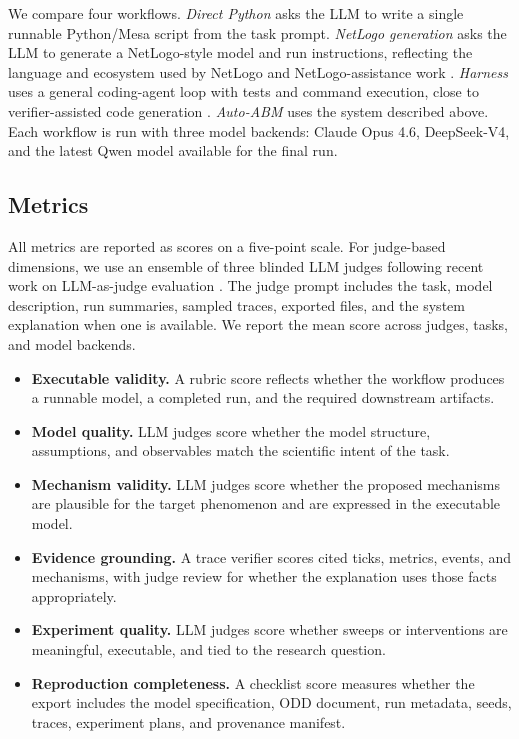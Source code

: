 \documentclass[11pt]{article}
\newcommand{\sys}{Auto-ABM}
\begin{document}
We compare four workflows. \textit{Direct Python} asks the LLM to write a single runnable Python/Mesa script from the task prompt. \textit{NetLogo generation} asks the LLM to generate a NetLogo-style model and run instructions, reflecting the language and ecosystem used by NetLogo and NetLogo-assistance work \citep{wilensky1999netlogo,chen2024netlogochat,martinez2024netlogo}. \textit{Harness} uses a general coding-agent loop with tests and command execution, close to verifier-assisted code generation \citep{niu2024sage}. \textit{\sys{}} uses the system described above. Each workflow is run with three model backends: Claude Opus 4.6, DeepSeek-V4, and the latest Qwen model available for the final run.

\subsection{Metrics}
\label{subsec:metrics}

All metrics are reported as scores on a five-point scale. For judge-based dimensions, we use an ensemble of three blinded LLM judges following recent work on LLM-as-judge evaluation \citep{liu2023geval,zheng2023judging}. The judge prompt includes the task, model description, run summaries, sampled traces, exported files, and the system explanation when one is available. We report the mean score across judges, tasks, and model backends.

\begin{itemize}[leftmargin=*]
  \item \textbf{Executable validity.} A rubric score reflects whether the workflow produces a runnable model, a completed run, and the required downstream artifacts.
  \item \textbf{Model quality.} LLM judges score whether the model structure, assumptions, and observables match the scientific intent of the task.
  \item \textbf{Mechanism validity.} LLM judges score whether the proposed mechanisms are plausible for the target phenomenon and are expressed in the executable model.
  \item \textbf{Evidence grounding.} A trace verifier scores cited ticks, metrics, events, and mechanisms, with judge review for whether the explanation uses those facts appropriately.
  \item \textbf{Experiment quality.} LLM judges score whether sweeps or interventions are meaningful, executable, and tied to the research question.
  \item \textbf{Reproduction completeness.} A checklist score measures whether the export includes the model specification, ODD document, run metadata, seeds, traces, experiment plans, and provenance manifest.
\end{itemize}
\end{document}
